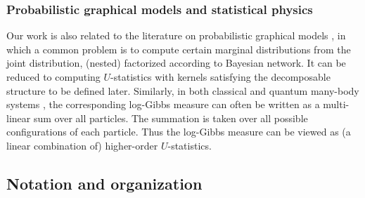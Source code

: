 \documentclass[twoside,11pt]{article}
\newcommand{\Zhang}[1]{{\color{blue}{Zhang: #1}}}
\begin{document}
\subsubsection*{Probabilistic graphical models and statistical physics}

Our work is also related to the literature on probabilistic graphical models \citep{pearl1988probabilistic, shpitser2011efficient}, in which a common problem is to compute certain marginal distributions from the joint distribution, (nested) factorized according to Bayesian network. It can be reduced to computing $U$-statistics with kernels satisfying the decomposable structure to be defined later. Similarly, in both classical \citep{talagrand2010mean, li2020random} and quantum many-body systems \citep{bernaschi2024quantum}, the corresponding log-Gibbs measure can often be written as a multi-linear sum over all particles. The summation is taken over all possible configurations of each particle. Thus the log-Gibbs measure can be viewed as (a linear combination of) higher-order $U$-statistics.






\subsection*{Notation and organization}
\end{document}
